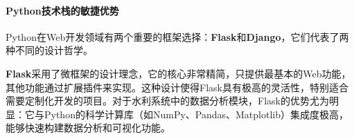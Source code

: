 \paragraph{Python技术栈的敏捷优势}\label{pythonux6280ux672fux6808ux7684ux654fux6377ux4f18ux52bf}

Python在Web开发领域有两个重要的框架选择：\textbf{Flask}和\textbf{Django}，它们代表了两种不同的设计哲学。

\textbf{Flask}采用了微框架的设计理念，它的核心非常精简，只提供最基本的Web功能，其他功能通过扩展插件来实现。这种设计使得Flask具有极高的灵活性，特别适合需要定制化开发的项目。对于水利系统中的数据分析模块，Flask的优势尤为明显：它与Python的科学计算库（如NumPy、Pandas、Matplotlib）集成度极高，能够快速构建数据分析和可视化功能。

\begin{Shaded}
\begin{Highlighting}[]

\OperatorTok{=}\NormalTok{)}

\NormalTok{(}\NormalTok{)}
\OperatorTok{=}
        \OperatorTok{=}\OperatorTok{=}\NormalTok{),}
        \NormalTok{, }\NormalTok{, }\NormalTok{)}
\NormalTok{    \})}
    

\end{Highlighting}
\end{Shaded}

